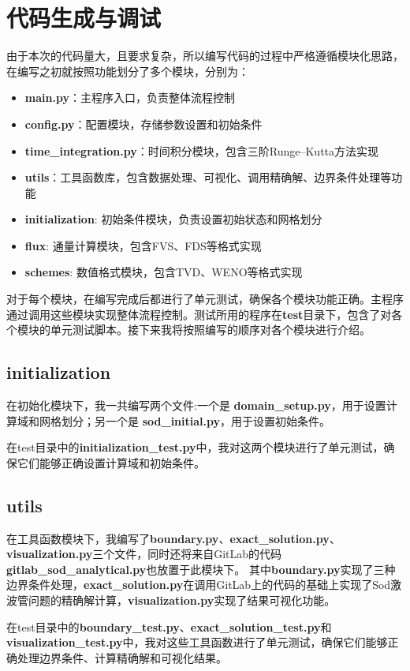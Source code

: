 \documentclass[UTF8]{ctexart}
\begin{document}
\newpage
\section{代码生成与调试}
由于本次的代码量大，且要求复杂，所以编写代码的过程中严格遵循模块化思路，在编写之初就按照功能划分了多个模块，分别为：
\begin{itemize}
    \item \textbf{main.py}：主程序入口，负责整体流程控制
    \item \textbf{config.py}：配置模块，存储参数设置和初始条件
    \item \textbf{time\_integration.py}：时间积分模块，包含三阶Runge--Kutta方法实现
    \item \textbf{utils}：工具函数库，包含数据处理、可视化、调用精确解、边界条件处理等功能
    \item \textbf{initialization}: 初始条件模块，负责设置初始状态和网格划分
    \item \textbf{flux}: 通量计算模块，包含FVS、FDS等格式实现
    \item \textbf{schemes}: 数值格式模块，包含TVD、WENO等格式实现
\end{itemize}
对于每个模块，在编写完成后都进行了单元测试，确保各个模块功能正确。主程序通过调用这些模块实现整体流程控制。测试所用的程序在\textbf{test}目录下，包含了对各个模块的单元测试脚本。接下来我将按照编写的顺序对各个模块进行介绍。
\subsection{initialization}
在初始化模块下，我一共编写两个文件:一个是 \textbf{domain\_setup.py}，用于设置计算域和网格划分；另一个是 \textbf{sod\_initial.py}，用于设置初始条件。

在test目录中的\textbf{initialization\_test.py}中，我对这两个模块进行了单元测试，确保它们能够正确设置计算域和初始条件。
\subsection{utils}
在工具函数模块下，我编写了\textbf{boundary.py}、\textbf{exact\_solution.py}、\textbf{visualization.py}三个文件，同时还将来自GitLab\cite{sodcal2025}的代码\textbf{gitlab\_sod\_analytical.py}也放置于此模块下。
其中\textbf{boundary.py}实现了三种边界条件处理，\textbf{exact\_solution.py}在调用GitLab上的代码的基础上实现了Sod激波管问题的精确解计算，\textbf{visualization.py}实现了结果可视化功能。

在test目录中的\textbf{boundary\_test.py}、\textbf{exact\_solution\_test.py}和\textbf{visualization\_test.py}中，我对这些工具函数进行了单元测试，确保它们能够正确处理边界条件、计算精确解和可视化结果。
\end{document}
